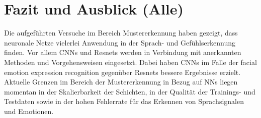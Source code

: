\section{Fazit und Ausblick (Alle)}
%
Die aufgeführten Versuche im Bereich Mustererkennung haben gezeigt, dass neuronale Netze vielerlei Anwendung in der Sprach- und Gefühlserkennung finden. Vor allem CNNs und Resnets werden in Verbindung mit an\-er\-kann\-ten Methoden und Vorgehensweisen eingesetzt. Dabei haben CNNs im Falle der facial emotion expression recognition gegenüber Resnets bessere Ergebnisse erzielt. Aktuelle Grenzen im Bereich der Mustererkennung in Bezug auf NNs liegen momentan in der Skalierbarkeit der Schichten, in der Qualität der Trainings- und Testdaten sowie in der hohen Fehlerrate für das Erkennen von Sprachsignalen und Emotionen.
